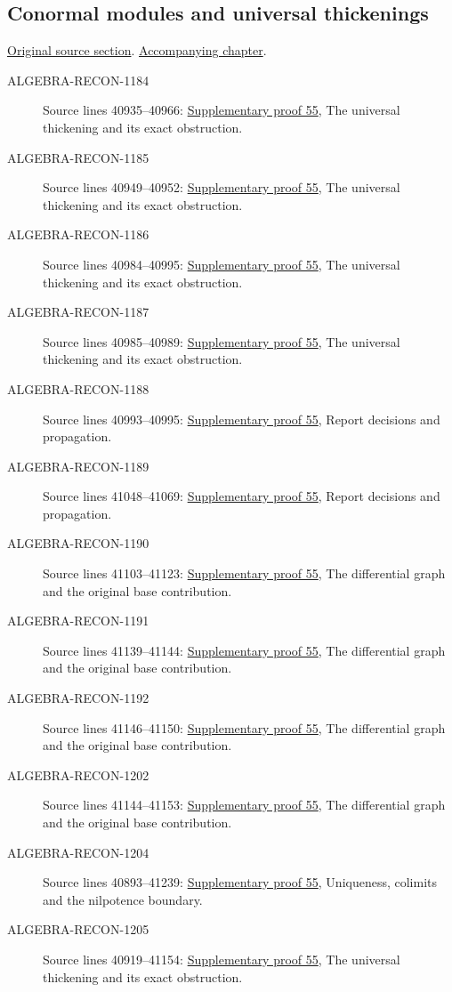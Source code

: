 \subsection{Conormal modules and universal thickenings}
\hypertarget{algebra-source-section-conormal}{}
\noindent\href{https://github.com/stacks/stacks-project/blob/a04446e57ec1fbc252a871afcec7752fb2807b14/algebra.tex\#L40911}{Original source section}. \href{algebra.pdf\#nameddest=section-conormal}{Accompanying chapter}.

\begin{description}
\item[ALGEBRA-RECON-1184] Source lines 40935--40966: \hyperlink{algebra_conormal_thickening_notes_20260928}{Supplementary proof 55}, The universal thickening and its exact obstruction.
\item[ALGEBRA-RECON-1185] Source lines 40949--40952: \hyperlink{algebra_conormal_thickening_notes_20260928}{Supplementary proof 55}, The universal thickening and its exact obstruction.
\item[ALGEBRA-RECON-1186] Source lines 40984--40995: \hyperlink{algebra_conormal_thickening_notes_20260928}{Supplementary proof 55}, The universal thickening and its exact obstruction.
\item[ALGEBRA-RECON-1187] Source lines 40985--40989: \hyperlink{algebra_conormal_thickening_notes_20260928}{Supplementary proof 55}, The universal thickening and its exact obstruction.
\item[ALGEBRA-RECON-1188] Source lines 40993--40995: \hyperlink{algebra_conormal_thickening_notes_20260928}{Supplementary proof 55}, Report decisions and propagation.
\item[ALGEBRA-RECON-1189] Source lines 41048--41069: \hyperlink{algebra_conormal_thickening_notes_20260928}{Supplementary proof 55}, Report decisions and propagation.
\item[ALGEBRA-RECON-1190] Source lines 41103--41123: \hyperlink{algebra_conormal_thickening_notes_20260928}{Supplementary proof 55}, The differential graph and the original base contribution.
\item[ALGEBRA-RECON-1191] Source lines 41139--41144: \hyperlink{algebra_conormal_thickening_notes_20260928}{Supplementary proof 55}, The differential graph and the original base contribution.
\item[ALGEBRA-RECON-1192] Source lines 41146--41150: \hyperlink{algebra_conormal_thickening_notes_20260928}{Supplementary proof 55}, The differential graph and the original base contribution.
\item[ALGEBRA-RECON-1202] Source lines 41144--41153: \hyperlink{algebra_conormal_thickening_notes_20260928}{Supplementary proof 55}, The differential graph and the original base contribution.
\item[ALGEBRA-RECON-1204] Source lines 40893--41239: \hyperlink{algebra_conormal_thickening_notes_20260928}{Supplementary proof 55}, Uniqueness, colimits and the nilpotence boundary.
\item[ALGEBRA-RECON-1205] Source lines 40919--41154: \hyperlink{algebra_conormal_thickening_notes_20260928}{Supplementary proof 55}, The universal thickening and its exact obstruction.
\end{description}

